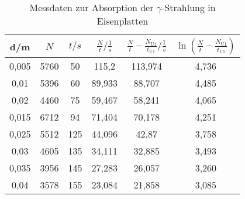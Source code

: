 \begin{table}[h!]
  \centering
  \caption{Messdaten zur Absorption der $\gamma$-Strahlung in Eisenplatten}
  \label{tab:fe}
  \begin{tabular}{c c c c c c}
    \toprule
    d/m &  $N$  & $t/s$ & $\frac{N}{t}/\frac{1}{s}$ & $\frac{N}{t}-\frac{N_{\text{U1}}}{t_{\text{U1}}}/ \frac{1}{s}$ &  $\ln{\left( \frac{N}{t}-\frac{N_{\text{U1}}}{t_{\text{U1}}} \right)} $ \\
    \midrule
    0,005 & 5760 & 50  & 115,2  &  113,974 &  4,736 \\
    0,01  & 5396 & 60  & 89,933 &  88,707  &  4,485 \\
    0,02  & 4460 & 75  & 59,467 &  58,241  &  4,065 \\
    0,015 & 6712 & 94  & 71,404 &  70,178  &  4,251 \\
    0,025 & 5512 & 125 & 44,096 &  42,87   &  3,758 \\
    0,03  & 4605 & 135 & 34,111 &  32,885  &  3,493 \\
    0,035 & 3956 & 145 & 27,283 &  26,057  &  3,260 \\
    0,04  & 3578 & 155 & 23,084 &  21,858  &  3,085 \\

    \bottomrule
  \end{tabular}
\end{table}

